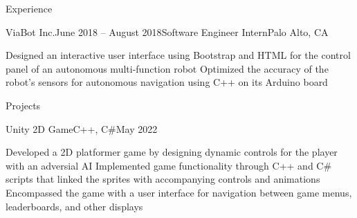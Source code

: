 \documentclass[11pt,fit=false]{cv_template}
\begin{document}
\begin{cv}
\begin{cvsection}{Experience}
\begin{cvsubsection}
\end{cvsubsection}


\begin{cvsubsection}
{ViaBot Inc.}{June 2018 -- August 2018}{Software Engineer Intern}{Palo Alto, CA}

\listitem Designed an interactive user interface using Bootstrap and HTML for the control panel of an autonomous multi-function robot
\listitem Optimized the accuracy of the robot's sensors for autonomous navigation using C++ on its Arduino board

\end{cvsubsection}


\end{cvsection}


\begin{cvsection}{Projects}


\begin{cvsubsection}
{Unity 2D Game}{C++, C\#}{May 2022}{}

\listitem Developed a 2D platformer game by designing dynamic controls for the player with an adversial AI
\listitem Implemented game functionality through C++ and C\# scripts that linked the sprites with accompanying controls and animations
\listitem Encompassed the game with a user interface for navigation between game
menus, leaderboards, and other displays

\end{cvsubsection}








\end{cvsection}
\end{cv}
\end{document}
